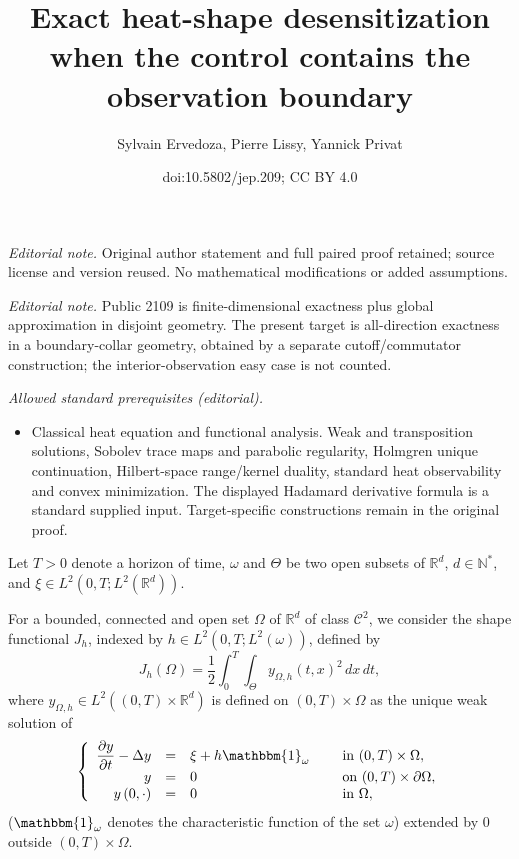 \documentclass[10pt,a4paper]{amsart}
\title{Exact heat-shape desensitization when the control contains the observation boundary}
\author{Sylvain Ervedoza, Pierre Lissy, Yannick Privat}
\date{doi:10.5802/jep.209; CC BY 4.0}
\newcommand\R{{\mathbb R}}
\theoremstyle{definition}
\begin{document}
\maketitle
\noindent\textit{Editorial note.} Original author statement and full paired proof retained; source license and version reused. No mathematical modifications or added assumptions.\par\medskip
\noindent\textit{Editorial note.} Public 2109 is finite-dimensional exactness plus global approximation in disjoint geometry. The present target is all-direction exactness in a boundary-collar geometry, obtained by a separate cutoff/commutator construction; the interior-observation easy case is not counted.\par\medskip
\noindent\textit{Allowed standard prerequisites (editorial).}\begin{itemize}
\item Classical heat equation and functional analysis. Weak and transposition solutions, Sobolev trace maps and parabolic regularity, Holmgren unique continuation, Hilbert-space range/kernel duality, standard heat observability and convex minimization. The displayed Hadamard derivative formula is a standard supplied input. Target-specific constructions remain in the original proof.
\end{itemize}\medskip
Let $T>0$ denote a horizon of time, $\omega$ and $\Theta$ be two open subsets of $\R^d$, $d\in\mathbb N^*$, and $\xi \in L^2(0,T; L^2(\R^d))$.

For a bounded, connected and open set $\Omega$ of $\mathbb{R}^d$ of class $\mathscr{C}^2$, we consider the shape functional $J_h$, indexed by $h \in L^2(0,T; L^2(\omega))$, defined by
\begin{equation}
\label{def-J}
J_h(\Omega) = \dfrac{1}{2}\int_{0}^{T} \int_{\Theta}y_{\Omega,h}(t,x)^{2}\, dx\,dt,
\end{equation}
where $y_{\Omega,h}\in L^2((0,T)\times \mathbb R^d)$ is defined on $(0,T)\times\Omega$ as the unique weak solution of
\begin{equation}
\label{y-Omega-h}
\left\{
\begin{array}{rcll}
\dfrac{\partial y}{\partial t}-\Delta y &=&\xi +h\mathbbm{1}_{\omega}\quad&\text{ in }(0,T) \times \Omega,
\\
y&=& 0 &\text{ on }(0,T) \times \partial \Omega,
\\
y\left(0,\cdot\right) &=& 0 &\text{ in }\Omega,
\end{array}
\right.
\end{equation}
($\mathbbm{1}_\omega$ denotes the characteristic function of the set $\omega$) extended by $0$ outside $(0,T) \times \Omega$.
\end{document}

